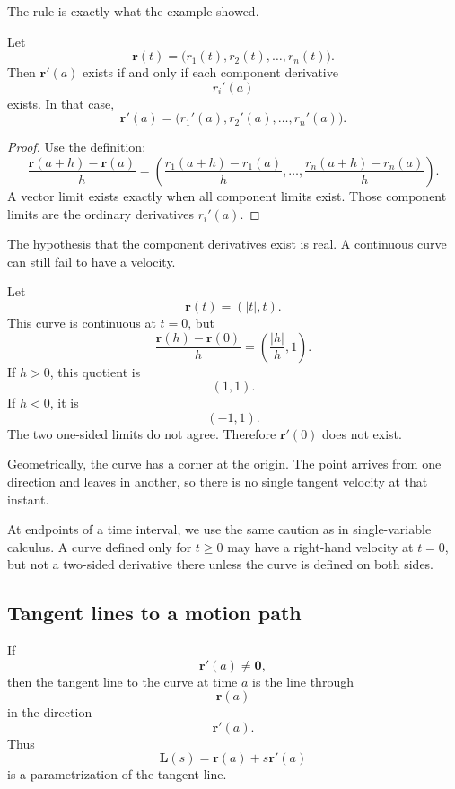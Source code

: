 The rule is exactly what the example showed.

\begin{theorem}
Let
\[
    \mathbf r(t)=\bigl(r_1(t),r_2(t),\ldots,r_n(t)\bigr).
\]
Then \(\mathbf r'(a)\) exists if and only if each component derivative
\[
    r_i'(a)
\]
exists.  In that case,
\[
\boxed{
    \mathbf r'(a)=
    \bigl(r_1'(a),r_2'(a),\ldots,r_n'(a)\bigr).
}
\]
\end{theorem}

\begin{proof}
Use the definition:
\[
\frac{\mathbf r(a+h)-\mathbf r(a)}{h}
=
\left(
\frac{r_1(a+h)-r_1(a)}{h},
\ldots,
\frac{r_n(a+h)-r_n(a)}{h}
\right).
\]
A vector limit exists exactly when all component limits exist.  Those component limits
are the ordinary derivatives \(r_i'(a)\).
\end{proof}

The hypothesis that the component derivatives exist is real.  A continuous curve can
still fail to have a velocity.

\begin{example}
Let
\[
    \mathbf r(t)=(|t|,t).
\]
This curve is continuous at \(t=0\), but
\[
    \frac{\mathbf r(h)-\mathbf r(0)}{h}
    =
    \left(\frac{|h|}{h},1\right).
\]
If \(h>0\), this quotient is
\[
    (1,1).
\]
If \(h<0\), it is
\[
    (-1,1).
\]
The two one-sided limits do not agree.  Therefore \(\mathbf r'(0)\) does not exist.

Geometrically, the curve has a corner at the origin.  The point arrives from one
direction and leaves in another, so there is no single tangent velocity at that instant.
\end{example}

At endpoints of a time interval, we use the same caution as in single-variable calculus.
A curve defined only for \(t\ge0\) may have a right-hand velocity at \(t=0\), but not a
two-sided derivative there unless the curve is defined on both sides.

\subsection{Tangent lines to a motion path}

If
\[
    \mathbf r'(a)\ne\mathbf 0,
\]
then the tangent line to the curve at time \(a\) is the line through
\[
    \mathbf r(a)
\]
in the direction
\[
    \mathbf r'(a).
\]
Thus
\[
\boxed{
    \mathbf L(s)=\mathbf r(a)+s\mathbf r'(a)
}
\]
is a parametrization of the tangent line.

